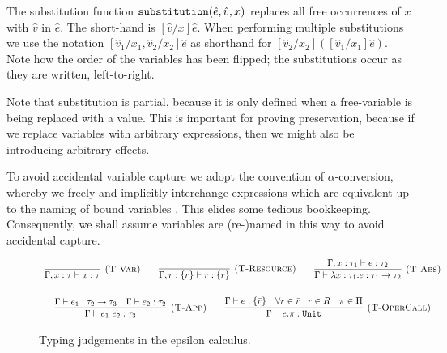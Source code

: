\noindent
The substitution function $\mathtt{substitution}(\hat e, \hat v, x)$ replaces all free occurrences of $x$ with $\hat v$ in $\hat e$. The short-hand is $[\hat v/x]\hat e$. When performing multiple substitutions we use the notation $[\hat v_1/x_1, \hat v_2/x_2]\hat e$ as shorthand for $[\hat v_2/x_2]([\hat v_1/x_1]\hat e)$. Note how the order of the variables has been flipped; the substitutions occur as they are written, left-to-right.

Note that substitution is partial, because it is only defined when a free-variable is being replaced with a value. This is important for proving preservation, because if we replace variables with arbitrary expressions, then we might also be introducing arbitrary effects.

To avoid accidental variable capture we adopt the convention of $\alpha$-conversion, whereby we freely and implicitly interchange expressions which are equivalent up to the naming of bound variables \cite[p. 71]{tapl}. This elides some tedious bookkeeping. Consequently, we shall assume variables are (re-)named in this way to avoid accidental capture.



\begin{figure}[h]


\[
\begin{array}{c}


\infer[\textsc{(T-Var)}]
	{\Gamma, x: \tau \vdash x: \tau}
	{}
~~~~~~
\infer[\textsc{(T-Resource)}]
	{\Gamma, r: \{ r \} \vdash r : \{ r \}}
	{}

~~~~~~
\infer[\textsc{(T-Abs)}]
	{\Gamma \vdash \lambda x: \tau_1.e : \tau_1 \rightarrow \tau_2}
	{\Gamma, x: \tau_1 \vdash e: \tau_2}\\[4ex]
	
\infer[\textsc{(T-App)}]
	{\Gamma \vdash e_1~e_2: \tau_3}
	{\Gamma \vdash e_1: \tau_2 \rightarrow \tau_3 & \Gamma \vdash e_2: \tau_2}
~~~~~~
\infer[\textsc{(T-OperCall)}]
	{\Gamma \vdash e.\pi: \kwa{Unit}}
	{\Gamma \vdash e: \{ \bar r \} & \forall r \in \bar r \mid r \in R & \pi \in \Pi}

\end{array}
\]

\vspace{-7pt}
\caption{Typing judgements in the epsilon calculus.}
\label{This is the label.}
\end{figure}

\noindent

